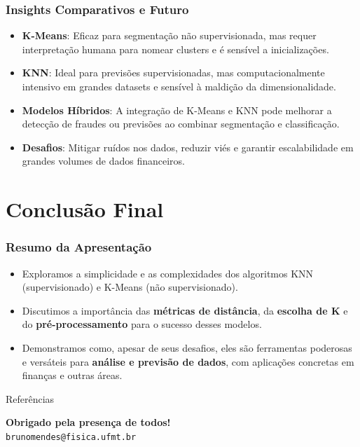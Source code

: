 \documentclass{beamer}
\begin{document}
\begin{frame}
    \frametitle{Insights Comparativos e Futuro}
    \begin{itemize}
        \item \textbf{K-Means}: Eficaz para segmentação não supervisionada, mas requer interpretação humana para nomear clusters e é sensível a inicializações.
        \item \textbf{KNN}: Ideal para previsões supervisionadas, mas computacionalmente intensivo em grandes datasets e sensível à maldição da dimensionalidade.
        \item \textbf{Modelos Híbridos}: A integração de K-Means e KNN pode melhorar a detecção de fraudes ou previsões ao combinar segmentação e classificação.
        \item \textbf{Desafios}: Mitigar ruídos nos dados, reduzir viés e garantir escalabilidade em grandes volumes de dados financeiros.
    \end{itemize}
\end{frame}
\section{Conclusão Final}

\begin{frame}
    \frametitle{Resumo da Apresentação}
    \begin{itemize}
        \item Exploramos a simplicidade e as complexidades dos algoritmos KNN (supervisionado) e K-Means (não supervisionado).
        \item Discutimos a importância das \textbf{métricas de distância}, da \textbf{escolha de K} e do \textbf{pré-processamento} para o sucesso desses modelos.
        \item Demonstramos como, apesar de seus desafios, eles são ferramentas poderosas e versáteis para \textbf{análise e previsão de dados}, com aplicações concretas em finanças e outras áreas.
    \end{itemize}
\end{frame}

\begin{frame}[allowframebreaks]{Referências}
    
    
\end{frame}

\begin{frame}
  \begin{center}
    \vfill
    \textbf{\huge Obrigado pela presença de todos!}
    \vspace{1cm}
    \\
     \texttt{brunomendes@fisica.ufmt.br} 
    \vfill
  \end{center}
\end{frame}
\end{document}

